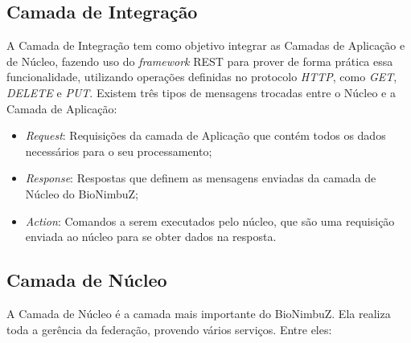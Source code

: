 \subsection{Camada de Integração} A Camada de Integração tem como objetivo integrar as Camadas de Aplicação e de Núcleo, fazendo uso do \textit{framework} \acrshort{REST} para prover de forma prática essa funcionalidade, utilizando operações definidas no protocolo \textit{HTTP}, como \textit{GET}, \textit{DELETE} e \textit{PUT}.
Existem três tipos de mensagens trocadas entre o Núcleo e a Camada de Aplicação:
\begin{itemize}
	\item \textit{Request}: Requisições da camada de Aplicação que contém todos os dados necessários para o seu processamento;
	\item \textit{Response}: Respostas que definem as mensagens enviadas da camada de Núcleo do BioNimbuZ;
	\item \textit{Action}: Comandos a serem executados pelo núcleo, que são uma requisição enviada ao núcleo para se obter dados na resposta.
\end{itemize}
	
	\subsection{Camada de Núcleo} A Camada de Núcleo é a camada mais importante do BioNimbuZ. Ela realiza toda a gerência da federação, provendo vários serviços. Entre eles:


